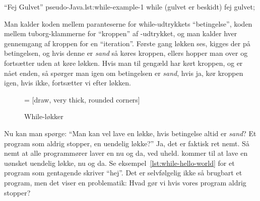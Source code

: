 		\begin{JavaCode}{``Fej Gulvet'' pseudo-Java.}{lst:while-example-1}
			while (gulvet er beskidt) {
				fej gulvet;
			}
		\end{JavaCode}

        Man kalder koden mellem paranteserne for while-udtrykkets
        ``betingelse'', koden mellem tuborg-klammerne for ``kroppen''
        af -udtrykket, og man kalder hver gennemgang
        af kroppen for en ``iteration''. Første gang løkken ses,
        kigges der på betingelsen, og hvis denne er \emph{sand} så
        køres kroppen, ellers hopper man over og fortsætter uden at
        køre løkken. Hvis man til gengæld har kørt kroppen, og er nået
        enden, så spørger man igen om betingelsen er \emph{sand}, hvis
        ja, kør kroppen igen, hvis ikke, fortsætter vi efter løkken.

        \begin{figure}
        \center
         = [draw, very thick, rounded corners]
        \caption{While-løkker}
        \label{fig:while-loop-illustrated}
        \end{figure}


        Nu kan man spørge: ``Man kan vel lave en løkke, hvis
        betingelse altid er \emph{sand}? Et program som aldrig
        stopper, en uendelig løkke?'' Ja, det er faktisk ret nemt. Så
        nemt at alle programmører laver en nu og da, ved uheld.
        kommer til at lave en uønsket uendelig løkke, nu og da. Se
        eksempel~\ref{lst:while-hello-world} for et program som
        gentagende skriver ``hej''. Det er selvfølgelig ikke så
        brugbart et program, men det viser en problematik: Hvad gør vi
        hvis vores program aldrig stopper? 

